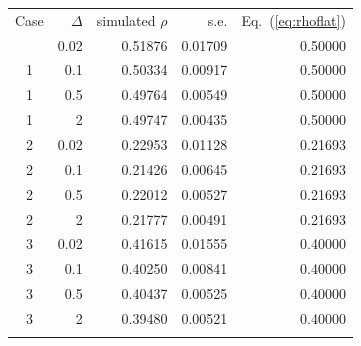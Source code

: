\begin{tabular}{@{}crrrr@{}}
\toprule
Case & $\Delta$ & simulated $\rho$ & s.e. & Eq.~(\ref{eq:rhoflat}) \\
\colrule
1 & 0.02 & 0.51876 & 0.01709 & 0.50000 \\
1 & 0.1 & 0.50334 & 0.00917 & 0.50000 \\
1 & 0.5 & 0.49764 & 0.00549 & 0.50000 \\
1 & 2 & 0.49747 & 0.00435 & 0.50000 \\
2 & 0.02 & 0.22953 & 0.01128 & 0.21693 \\
2 & 0.1 & 0.21426 & 0.00645 & 0.21693 \\
2 & 0.5 & 0.22012 & 0.00527 & 0.21693 \\
2 & 2 & 0.21777 & 0.00491 & 0.21693 \\
3 & 0.02 & 0.41615 & 0.01555 & 0.40000 \\
3 & 0.1 & 0.40250 & 0.00841 & 0.40000 \\
3 & 0.5 & 0.40437 & 0.00525 & 0.40000 \\
3 & 2 & 0.39480 & 0.00521 & 0.40000 \\
\botrule
\end{tabular}